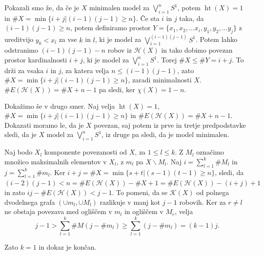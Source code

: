 \documentclass[mat1]{fmfdelo}
\DeclareRobustCommand{\k}{
    \mathcal{K}
}
\DeclareRobustCommand{\h}{
    \mathcal{H}
}
\DeclareMathOperator*{\htt}{ht}
\begin{document}
\begin{dokaz}
    Pokazali smo že, da če je $X$ minimalen model za $\bigvee\limits_{i=1}^{n}S^1$, potem $\htt(X)=1$ in $\#X=\min\{i+j|(i-1)(j-1)\geq n\}$. 
    Če sta $i$ in $j$ taka, da $(i-1)(j-1)\geq n$, potem definiramo prostor $Y=\{x_1,x_2,...x_i,y_1,y_2,...y_j\}$ z ureditvijo $y_k<x_l$ 
    za vse $k$ in $l$, ki je model za $\bigvee\limits_{i=1}^{(i-1)(j-1)}S^1$. Potem lahko odstranimo $(i-1)(j-1)-n$ robov iz $\h(X)$ in tako dobimo povezan prostor kardinalnosti $i+j$, ki je model za $\bigvee\limits_{i=1}^{n}S^1$. Torej $\#X\leq \#Y=i+j$. To drži za vsaka $i$ in $j$, za katera velja $n\leq (i-1)(j-1)$, zato $\#X=\min\{i+j|(i-1)(j-1)\geq n\}$, zaradi minimalnosti $X$. $\#E(\h(X))= \#X + n -1$ pa sledi, ker $\chi(X)= 1-n$.

    Dokažimo še v drugo smer. Naj velja  $\htt(X)=1$, $\#X=\min\{i+j|(i-1)(j-1)\geq n\}$ in $\#E(\h(X))= \#X + n -1.$ Dokazati moramo le, da je $X$ povezan, saj potem iz prve in tretje predpodstavke sledi, da je $X$ model za  $\bigvee\limits_{i=1}^{n}S^1$, iz druge pa sledi, da je model minimalen.

    Naj bodo $X_l$ komponente povezanosti od $X$, za $1\leq l \leq k$. Z $M_l$ označimo množico maksimalnih elementov v $X_l$, z $m_l$ pa $X\backslash M_l$. Naj $i= \sum\limits_{l=1}^k \# M_l$ in $j= \sum\limits_{l=1}^k \# m_l$. Ker $i+j=\# X =\min \{s+t|(s-1)(t-1)\geq n\}$, sledi, da $(i-2)(j-1)<n=\# E(\h(X))-\# X +1=\#E(\h(X)) -(i+j) +1$ in zato $ij -\# E(\h(X))<j-1$. To pomeni, da se $\k(X)$ od polnega dvodelnega grafa $(\cup m_l,\cup M_l)$
    razlikuje v manj kot $j-1$ robovih. Ker za $r\neq l$ ne obstaja povezava med ogliščem v $m_l$ in ogliščem v $M_r$, velja
    $$
        j-1>\sum\limits_{l=1}^{k}\# M(j- \# m_l)\geq \sum\limits_{l=1}^{k}(j- \# m_l)=(k-1)j.
    $$

    Zato $k=1$ in dokaz je končan.
\end{dokaz}
\end{document}
